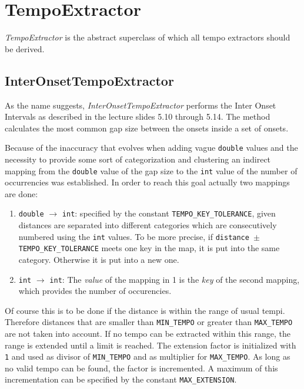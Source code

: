 \section{\ttfamily TempoExtractor} \label{sec:tempo}
\emph{TempoExtractor} is the abstract superclass of which all tempo extractors
should be derived.

\subsection{\ttfamily InterOnsetTempoExtractor} \label{ssec:tempointeronset}
As the name suggests, \emph{InterOnsetTempoExtractor} performs the Inter Onset
Intervals as described in the lecture slides 5.10 through 5.14. The method
calculates the most common gap size between the onsets inside a set of onsets. 

Because of the inaccuracy that evolves when adding vague \texttt{double}
values and the necessity to provide some sort of categorization and
clustering an indirect mapping from the \texttt{double} value of the
gap size to the \texttt{int} value of the number of occurrencies was
established. In order to reach this goal actually two mappings are done:

\begin{enumerate}
  \item \texttt{double} $\rightarrow$ \texttt{int}: specified by the constant
  \texttt{TEMPO\_KEY\_TOLERANCE}, given distances are separated into different
  categories which are consecutively numbered using the \texttt{int} values. To
  be more precise, if \texttt{distance $\pm$ TEMPO\_KEY\_TOLERANCE}
  meets one key in the map, it is put into the same category. Otherwise it is
  put into a new one.
  \item \texttt{int} $\rightarrow$ \texttt{int}: The \emph{value} of the
  mapping in 1 is the \emph{key} of the second mapping, which provides the
  number of occurencies.
\end{enumerate}

Of course this is to be done if the distance is within the range of usual tempi.
Therefore distances that are smaller than \texttt{MIN\_TEMPO} or greater than
\texttt{MAX\_TEMPO} are not taken into account. If no tempo can be extracted
within this range, the range is extended until a limit is reached. The extension
factor is initialized with \texttt{1} and used as divisor of \texttt{MIN\_TEMPO}
and as multiplier for \texttt{MAX\_TEMPO}. As long as no valid tempo can be
found, the factor is incremented. A maximum of this incrementation can be
specified by the constant \texttt{MAX\_EXTENSION}.

